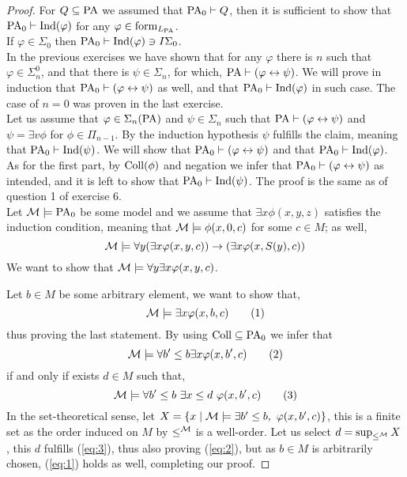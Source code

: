 \begin{proof}
	For $Q \subseteq \operatorname{PA}$ we assumed that $\operatorname{PA}_0 \vdash Q$, then it is sufficient to show that $\operatorname{PA}_0 \vdash \operatorname{Ind}(\varphi)$ for any $\varphi \in \operatorname{form}_{L_{\operatorname{PA}}}$. \\
	If $\varphi \in \Sigma_0$ then $\operatorname{PA}_0 \vdash \operatorname{Ind}(\varphi) \ni I \Sigma_0$. \\
	In the previous exercises we have shown that for any $\varphi$ there is $n$ such that $\varphi \in \Sigma_n^0$, and that there is $\psi \in \Sigma_n$, for which, $\operatorname{PA} \vdash (\varphi \leftrightarrow \psi)$.
	We will prove in induction that $\operatorname{PA}_0 \vdash (\varphi \leftrightarrow \psi)$ as well, and that $\operatorname{PA}_0 \vdash \operatorname{Ind}(\varphi)$ in such case.
	The case of $n = 0$ was proven in the last exercise. \\
	Let us assume that $\varphi \in \Sigma_n(\operatorname{PA})$ and $\psi \in \Sigma_n$ such that $\operatorname{PA} \vdash (\varphi \leftrightarrow \psi)$ and $\psi = \exists v \phi$ for $\phi \in \Pi_{n - 1}$.
	By the induction hypothesis $\psi$ fulfills the claim, meaning that $\operatorname{PA}_0 \vdash \operatorname{Ind}(\psi)$.
	We will show that $\operatorname{PA}_0 \vdash (\varphi \leftrightarrow \psi)$ and that $\operatorname{PA}_0 \vdash \operatorname{Ind}(\varphi)$. \\
	As for the first part, by $\operatorname{Coll}(\phi)$ and negation we infer that $\operatorname{PA}_0 \vdash (\varphi \leftrightarrow \psi)$ as intended, and it is left to show that $\operatorname{PA}_0 \vdash \operatorname{Ind}(\psi)$.
	The proof is the same as of question 1 of exercise 6. \\
	Let $\mathcal{M} \models \operatorname{PA}_0$ be some model and we assume that $\exists x \phi(x, y, z)$ satisfies the induction condition, meaning that $\mathcal{M} \models \phi(x, 0, c)$ for some $c \in M$;
	as well,
	\[
		\mathcal{M} \models \forall y (\exists x \varphi(x, y, c)) \to (\exists x \varphi(x, S(y), c))
	\]
	We want to show that $\mathcal{M} \models \forall y \exists x \varphi(x, y, c)$. 

	Let $b \in M$ be some arbitrary element, we want to show that,
	\[ \label{eq:1}
		\mathcal{M} \models \exists x \varphi(x, b, c)
		\tag{1}
	\]
	thus proving the last statement.
	By using $\operatorname{Coll} \subseteq \operatorname{PA}_0$ we infer that
	\[ \label{eq:2}
		\mathcal{M} \models \forall b' \le b \exists x \varphi(x, b', c)
		\tag{2}
	\]
	if and only if exists $d \in M$ such that,
	\[ \label{eq:3}
		\mathcal{M}
		\models \forall b' \le b\ \exists x \le d\ \varphi(x, b', c)
		\tag{3}
	\]
	In the set-theoretical sense, let $X = \{ x \mid \Mm \models \exists b' \le b,\ \varphi(x, b', c) \}$, this is a finite set as the order induced on $M$ by $\le^{\mathcal{M}}$ is a well-order.
	Let us select $d = \sup_{\le^{\mathcal{M}}} X$, this $d$ fulfills (\ref{eq:3}), thus also proving (\ref{eq:2}), but as $b \in M$ is arbitrarily chosen, (\ref{eq:1}) holds as well, completing our proof.
\end{proof}

